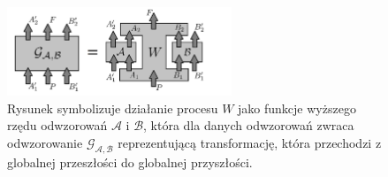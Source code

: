 \documentclass[10pt]{article} %
\begin{document}
\begin{figure}[t]
\centering
\includegraphics[width=0.6\textwidth]{obrazki/done1}
\caption{
Rysunek symbolizuje działanie procesu $W$ jako funkcje wyższego rzędu odwzorowań $\mathcal{A}$ i $\mathcal{B}$, która dla danych odwzorowań zwraca odwzorowanie 
$\mathcal{G_{A,B}}$ reprezentującą transformację, która przechodzi z globalnej przeszłości do globalnej przyszłości.
}
\label{higherordermap}
\end{figure}
\end{document}
